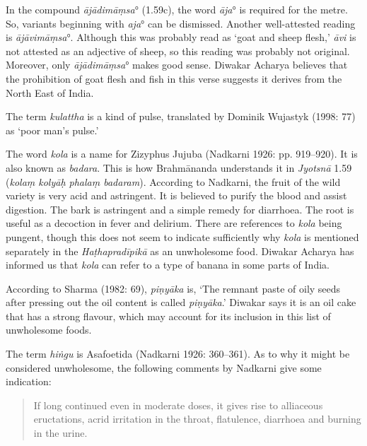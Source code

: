 \begin{ekdosis}
\begin{philcomm}[hp01_059]
In the compound \emph{ājādimāṃsa}° (1.59c), the word \emph{āja}° is required for the metre. So, variants beginning with \emph{aja}° can be dismissed. Another well-attested reading is \emph{ājāvimāṃsa}°. Although this was probably read as `goat and sheep flesh,' \emph{āvi} is not attested as an adjective of sheep, so this reading was probably not original. Moreover, only \emph{ājādimāṃsa}° makes good sense. Diwakar Acharya believes that the prohibition of goat flesh and fish in this verse suggests it derives from the North East of India.

The term \emph{kulattha} is a kind of pulse, translated by Dominik Wujastyk (1998: 77) as `poor man's pulse.'

The word \emph{kola} is a name for Zizyphus Jujuba (Nadkarni 1926: pp. 919--920). It is also known as \emph{badara}. This is how Brahmānanda understands it in \emph{Jyotsnā} 1.59 (\emph{kolaṃ kolyāḥ phalaṃ badaram}). According to Nadkarni, the fruit of the wild variety is very acid and astringent. It is believed to purify the blood and assist digestion. The bark is astringent and a simple remedy for diarrhoea. The root is useful as a decoction in fever and delirium. There are references to \emph{kola} being pungent, though this does not seem to indicate sufficiently why \emph{kola} is mentioned separately in the \emph{Haṭhapradīpikā} as an unwholesome food. Diwakar Acharya has informed us that \emph{kola} can refer to a type of banana in some parts of India.

According to Sharma (1982: 69), \emph{piṇyāka} is, ‘The remnant paste of oily seeds after pressing out the oil content is called \emph{piṇyāka}.’ Diwakar says it is an oil cake that has a strong flavour, which may account for its inclusion in this list of unwholesome foods.

The term \emph{hiṅgu} is Asafoetida (Nadkarni 1926: 360–361). As to why it might be considered unwholesome, the following comments by Nadkarni give some indication:
\begin{quote}
If long continued even in moderate doses, it gives rise to alliaceous eructations, acrid irritation in the throat, flatulence, diarrhoea and burning in the urine.
\end{quote}

\end{philcomm}


\end{ekdosis}
